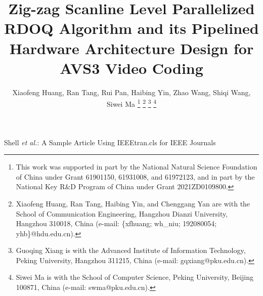 \documentclass[lettersize,journal]{IEEEtran}
\begin{document}
\title{Zig-zag Scanline Level Parallelized RDOQ Algorithm and its Pipelined Hardware Architecture Design for AVS3 Video Coding}

\author{Xiaofeng Huang, Ran Tang, Rui Pan, Haibing Yin, Zhao Wang, Shiqi Wang, Siwei Ma
\thanks{This work was supported in part by the National Natural Science Foundation of China under Grant 61901150, 61931008, and 61972123, and in part by the National Key R\&D Program of China under Grant 2021ZD0109800.}%
\thanks{Xiaofeng Huang, Ran Tang, Haibing Yin, and Chenggang Yan are
with the School of Communication Engineering, Hangzhou Dianzi University,
Hangzhou 310018, China (e-mail: \{xfhuang; wh\_niu; 192080054; yhb\}@hdu.edu.cn).}
\thanks{Guoqing Xiang is with the Advanced Institute of Information Technology, Peking University,
Hangzhou 311215, China (e-mail: gqxiang@pku.edu.cn).}
\thanks{Siwei Ma is with the School of Computer Science, Peking University,
Beijing 100871, China (e-mail: swma@pku.edu.cn).}
}

%
{Shell \MakeLowercase{\textit{et al.}}: A Sample Article Using IEEEtran.cls for IEEE Journals}


\maketitle
\end{document}
